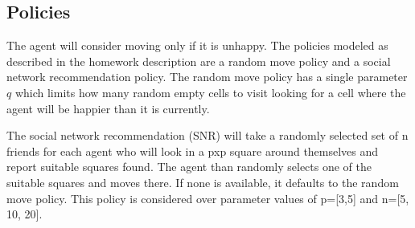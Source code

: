 \documentclass[11pt]{article}
\begin{document}
\subsection{Policies}\label{subsec:policies}
The agent will consider moving only if it is unhappy. The policies modeled as described in the homework description are a random move policy and a social network recommendation policy. The random move policy has a single parameter $q$ which limits how many random empty cells to visit looking for a cell where the agent will be happier than it is currently. 

The social network recommendation (SNR) will take a randomly selected set of n friends for each agent who will look in a pxp square around themselves and report suitable squares found. The agent than randomly selects one of the suitable squares and moves there. If none is available, it defaults to the random move policy. This policy is considered over parameter values of p=[3,5] and n=[5, 10, 20].
\end{document}
